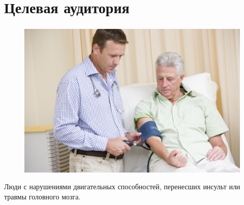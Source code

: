 \section{Целевая аудитория}


\begin{frame}
    \frametitle{\insertsection} 
    \framesubtitle{\insertsubsection}
    \begin{figure} 
        \vspace{-5ex}
        \includegraphics[width=\linewidth]{4.jpg}
    \end{figure}
    \large Люди с нарушениями двигательных способностей, перенесших инсульт или травмы головного мозга.
\end{frame}